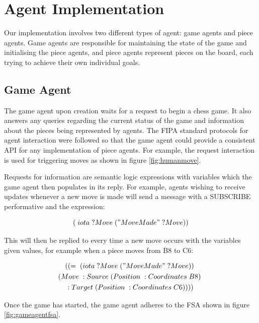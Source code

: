 \documentclass{article}
\begin{document}
\section{Agent Implementation} \label{sec:agentimpl}

Our implementation involves two different types of agent: game agents and piece agents. Game agents are responsible for maintaining the state of the game and initialising the piece agents, and piece agents represent pieces on the board, each trying to achieve their own individual goals.

\subsection{Game Agent}

The game agent upon creation waits for a request to begin a chess game. It also answers any queries regarding the current status of the game and information about the pieces being represented by agents. The FIPA standard protocols for agent interaction \cite{fipaprotocols} were followed so that the game agent could provide a consistent API for any implementation of piece agents. For example, the request interaction is used for triggering moves as shown in figure \ref{fig:humanmove}. 

Requests for information are semantic logic expressions with variables which the game agent then populates in its reply. For example, agents wishing to receive updates whenever a new move is made will send a message with a SUBSCRIBE performative and the expression:

\begin{equation} \label{eq:movesubscribe}
	(\;iota\; ?Move\; ("Move Made"\; ?Move))	
\end{equation}

This will then be replied to every time a new move occurs with the variables given values, for example when a piece moves from B8 to C6:

\begin{multline} \label{eq:movesubscriberesponse}
	((=\; (iota\; ?Move\; ("Move Made"\; ?Move))\;  \\
	(Move\; :Source\; (Position\; :Coordinates\; B8)\; \\
	:Target\; (Position\; :Coordinates\; C6))))
\end{multline}

Once the game has started, the game agent adheres to the FSA shown in figure \ref{fig:gameagentfsa}. 
\end{document}
